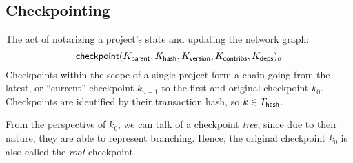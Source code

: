 
\subsection{Checkpointing}
\label{s:checkpoint}
The act of notarizing a project's state and updating the network graph:
\[
    \operatorname{\mathsf{checkpoint}}\lparen K_{\mathsf{parent}}, K_{\mathsf{hash}}, K_{\mathsf{version}},
    K_{\mathsf{contribs}}, K_{\mathsf{deps}}\rparen_\sigma
\]
Checkpoints within the scope of a single project form a chain going from the
latest, or ``current'' checkpoint $k_{n-1}$ to the first and original
checkpoint $k_0$. Checkpoints are identified by their transaction hash,
so $k \in T_{\mathsf{hash}}$.

From the perspective of $k_0$, we can talk of a checkpoint \emph{tree}, since
due to their nature, they are able to represent branching. Hence, the original
checkpoint $k_0$ is also called the \emph{root} checkpoint.

